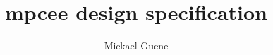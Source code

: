 \documentclass{report}
\begin{document}
\title{\Huge \bfseries mpcee design specification}
\author{Mickael Guene}
\maketitle
\tableofcontents











\end{document}
